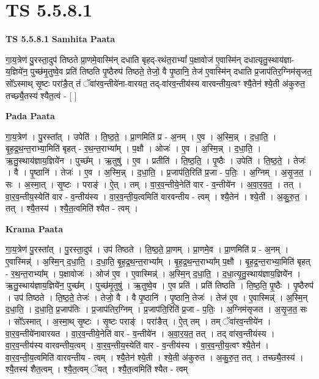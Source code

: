 \documentclass[17pt]{extarticle}
\begin{document}
\section{ TS 5.5.8.1 }

\textbf{TS 5.5.8.1 } \newline
\textbf{Samhita Paata} \newline

गा॒य॒त्रेण॑ पु॒रस्ता॒दुप॑ तिष्ठते प्रा॒णमे॒वास्मि॑न् दधाति बृहद्-रथंत॒राभ्यां᳚ प॒क्षावोज॑ ए॒वास्मि॑न् दधात्यृतु॒स्थाय॑ज्ञा-य॒ज्ञिये॑न॒ पुच्छ॑मृ॒तुष्वे॒व प्रति॑ तिष्ठति पृ॒ष्ठैरुप॑ तिष्ठते॒ तेजो॒ वै पृ॒ष्ठानि॒ तेज॑ ए॒वास्मि॑न् दधाति प्र॒जाप॑तिर॒ग्निम॑सृजत॒ सो᳚ऽस्माथ् सृ॒ष्टः परा॑ङै॒त् तं ॅवा॑रव॒न्तीये॑ना-वारयत॒ तद्-वा॑रव॒न्तीय॑स्य वारवन्तीय॒त्वꣳ श्यै॒तेन॑ श्ये॒ती अ॑कुरुत॒ तच्छ्यै॒तस्य॑ श्यैत॒त्वं - [  ] \newline

\textbf{Pada Paata} \newline

गा॒य॒त्रेण॑ । पु॒रस्ता᳚त् । उपेति॑ । ति॒ष्ठ॒ते॒ । प्रा॒णमिति॑ प्र - अ॒नम् । ए॒व । अ॒स्मि॒न्न् । द॒धा॒ति॒ । बृ॒ह॒द्र॒थ॒न्त॒राभ्या॒मिति॑ बृहत् - र॒थ॒न्त॒राभ्या᳚म् । प॒क्षौ । ओजः॑ । ए॒व । अ॒स्मि॒न्न् । द॒धा॒ति॒ । ऋ॒तु॒स्थाय॑ज्ञाय॒ज्ञिये॑न । पुच्छ᳚म् । ऋ॒तुषु॑ । ए॒व । प्रतीति॑ । ति॒ष्ठ॒ति॒ । पृ॒ष्ठैः । उपेति॑ । ति॒ष्ठ॒ते॒ । तेजः॑ । वै । पृ॒ष्ठानि॑ । तेजः॑ । ए॒व । अ॒स्मि॒न्न् । द॒धा॒ति॒ । प्र॒जाप॑ति॒रिति॑ प्र॒जा - प॒तिः॒ । अ॒ग्निम् । अ॒सृ॒ज॒त॒ । सः । अ॒स्मा॒त् । सृ॒ष्टः । पराङ्॑ । ऐ॒त् । तम् । वा॒र॒व॒न्तीये॒नेति॑ वार - व॒न्तीये॑न । अ॒वा॒र॒य॒त॒ । तत् । वा॒र॒व॒न्तीय॒स्येति॑ वार - व॒न्तीय॑स्य । वा॒र॒व॒न्ती॒य॒त्वमिति॑ वारवन्तीय - त्वम् । श्यै॒तेन॑ । श्ये॒ती । अ॒कु॒रु॒त॒ । तत् । श्यै॒तस्य॑ । श्यै॒त॒त्वमिति॑ श्यैत - त्वम् ।  \newline


\textbf{Krama Paata} \newline

गा॒य॒त्रेण॑ पु॒रस्ता᳚त् । पु॒रस्ता॒दुप॑ । उप॑ तिष्ठते । ति॒ष्ठ॒ते॒ प्रा॒णम् । प्रा॒णमे॒व । प्रा॒णमिति॑ प्र - अ॒नम् । ए॒वास्मिन्न्॑ । अ॒स्मि॒न् द॒धा॒ति॒ । द॒धा॒ति॒ बृ॒ह॒द्र॒थ॒न्त॒राभ्या᳚म् । बृ॒ह॒द्र॒थ॒न्त॒राभ्या᳚म् प॒क्षौ । बृ॒ह॒द्र॒न्त॒राभ्या॒मिति॑ बृहत् - र॒थ॒न्त॒राभ्या᳚म् । प॒क्षावोजः॑ । ओज॑ ए॒व । ए॒वास्मिन्न्॑ । अ॒स्मि॒न् द॒धा॒ति॒ । द॒धा॒त्यृ॒तु॒स्थाय॑ज्ञाय॒ज्ञिये॑न । ऋ॒तु॒स्थाय॑ज्ञाय॒ज्ञिये॑न॒ पुच्छ᳚म् । पुच्छ॑मृ॒तुषु॑ । ऋ॒तुष्वे॒व । ए॒व प्रति॑ । प्रति॑ तिष्ठति । ति॒ष्ठ॒ति॒ पृ॒ष्ठैः । पृ॒ष्ठैरुप॑ । उप॑ तिष्ठते । ति॒ष्ठ॒ते॒ तेजः॑ । तेजो॒ वै । वै पृ॒ष्ठानि॑ । पृ॒ष्ठानि॒ तेजः॑ । तेज॑ ए॒व । ए॒वास्मिन्न्॑ । अ॒स्मि॒न् द॒धा॒ति॒ । द॒धा॒ति॒ प्र॒जाप॑तिः । प्र॒जाप॑तिर॒ग्निम् । प्र॒जाप॑ति॒रिति॑ प्र॒जा - प॒तिः॒ । अ॒ग्निम॑सृजत । अ॒सृ॒ज॒त॒ सः । सो᳚ऽस्मात् । अ॒स्मा॒थ् सृ॒ष्टः । सृ॒ष्टः पराङ्॑ । परा॑ङैत् । ऐ॒त् तम् । तम् ॅवा॑रव॒न्तीये॑न । वा॒र॒व॒न्तीये॑नावारयत । वा॒र॒व॒न्तीये॒नेति॑ वार - व॒न्तीये॑न । अ॒वा॒र॒य॒त॒ तत् । तद् वा॑रव॒न्तीय॑स्य । वा॒र॒व॒न्तीय॑स्य वारवन्तीय॒त्वम् । वा॒र॒व॒न्तीय॒स्येति॑ वार - व॒न्तीय॑स्य । वा॒र॒व॒न्ती॒य॒त्वꣳ श्यै॒तेन॑ । वा॒र॒व॒न्ती॒य॒त्वमिति॑ वारवन्तीय - त्वम् । श्यै॒तेन॑ श्ये॒ती । श्ये॒ती अ॑कुरुत । अ॒कु॒रु॒त॒ तत् । तच्छ्यै॒तस्य॑ । श्यै॒तस्य॑ शैत॒त्वम् । श्यै॒त॒त्वम् ॅयत् । श्यै॒त॒त्वमिति॑ श्यैत - त्वम् \newline
\end{document}
